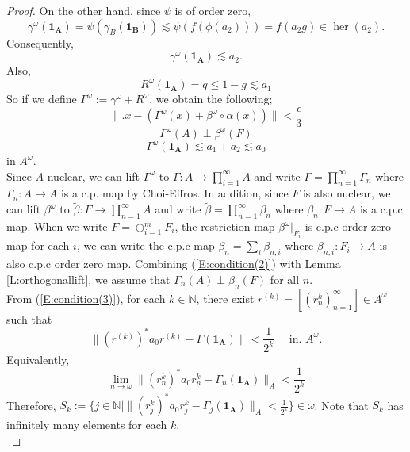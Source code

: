 \documentclass[10pt,a4paper]{amsart}
\def\her{\operatorname{her}}
\begin{document}
\begin{proof}
On the other hand,  since $\psi$ is of order zero, 
\[
\gamma^{\omega}(\mathbf{1_A})=\psi(\gamma_B(\mathbf{1_B})) \lesssim \psi(f(\phi(a_2))) = f(a_2 g) \in \her(a_2). 
\]
Consequently, 
\begin{equation}\label{E:Cuntz1}
\gamma^{\omega}(\mathbf{1_A}) \lesssim a_2.
\end{equation}
Also, 
\begin{equation}\label{E:Cuntz2}
R^{\omega}(\mathbf{1_A})=q \le1-g \lesssim a_1
\end{equation}
So if we define $\Gamma^{\omega}:= \gamma^{\omega}+ R^{\omega}$, we obtain the following; 
\begin{equation}\label{E:condition(1)}
\|.x -(\Gamma^{\omega}(x)+ \beta^{\omega} \circ \alpha(x))  \| < \frac{\epsilon}{3}
\end{equation} 
\begin{equation}\label{E:condition(2)}
\Gamma^{\omega}(A) \perp \beta^{\omega}(F)
\end{equation}
\begin{equation}\label{E:condition(3)}
\Gamma^{\omega}(\mathbf{1_A}) \lesssim a_1 +a_2 \lesssim a_0  
\end{equation}
in $A^{\omega}$.\\  
Since $A$ nuclear, we can lift $\Gamma^{\omega}$ to $\Gamma: A \to \prod_{i=1}^{\infty} A$ and write $\Gamma= \prod_{n=1}^{\infty} \Gamma_n $ where $\Gamma_n: A \to A$ is a c.p. map by Choi-Effros. In addition, since $F$ is also nuclear, we can lift $\beta^{\omega}$ to $\widetilde{\beta}: F \to \prod_{n=1}^{\infty} A$ and write $\widetilde{\beta}=\prod_{n=1}^{\infty} \beta_n$ where $\beta_n: F \to A$ is a c.p.c map.    When we write $F=\oplus_{i=1}^m F_i $, the restriction map $\beta^{\omega}|_{F_i}$ is c.p.c order zero map for each $i$, we can write the c.p.c map $\beta_n=\sum_i \beta_{n, i}$ where $\beta_{n, i}: F_i \to A$ is also c.p.c order zero map. Combining (\ref{E:condition(2)}) with  Lemma \ref{L:orthogonallift}, we assume that $\Gamma_n(A) \perp \beta_n(F)$ for all $n$.\\  
\noindent
 From (\ref{E:condition(3)}), for each $k \in \mathbb{N}$, there exist $r^{(k)}=[(r^k_n)_{n=1}^{\infty}] \in A^{\omega}$ such that 
 \[  \| (r^{(k)})^* a_0 r^{(k)} - \Gamma(\mathbf{1_A}) \|  < \frac{1}{2^k} \quad \text{ in. $A^{\omega}$}. \] 
 Equivalently, 
 \[ \lim_{n \to \omega} \| (r^k_n)^* a_0 r^k_n - \Gamma_n (\mathbf{1_A}) \|_A < \frac{1}{2^k} \] 
 Therefore, $S_k:= \{j \in \mathbb{N}\mid \| (r^k_j)^* a_0  r^k_j - \Gamma_j (\mathbf{1_A})\|_A < \frac{1}{2^k}  \} \in \omega$. Note that $S_k$ has infinitely many elements for each $k$. \\

\end{proof}
\end{document}
